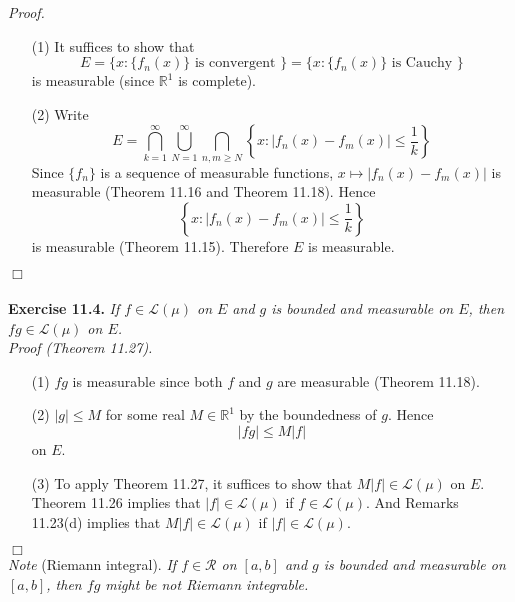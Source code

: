 \documentclass{article}
\begin{document}
\emph{Proof.}
\begin{enumerate}
\item[(1)]
  It suffices to show that
  \[
    E
    = \{ x : \{ f_n(x) \} \text{ is convergent } \}
    = \{ x : \{ f_n(x) \} \text{ is Cauchy } \}
  \]
  is measurable (since $\mathbb{R}^1$ is complete).

\item[(2)]
  Write
  \[
    E
    =
    \bigcap_{k=1}^{\infty}
    \bigcup_{N=1}^{\infty}
    \bigcap_{n,m \geq N} \left\{ x : |f_n(x)-f_m(x)| \leq \frac{1}{k} \right\}
  \]
  Since $\{f_n\}$ is a sequence of measurable functions,
  $x \mapsto |f_n(x)-f_m(x)|$ is measurable
  (Theorem 11.16 and Theorem 11.18).
  Hence
  \[
    \left\{ x : |f_n(x)-f_m(x)| \leq \frac{1}{k} \right\}
  \]
  is measurable (Theorem 11.15).
  Therefore $E$ is measurable.
\end{enumerate}
$\Box$ \\\\






\textbf{Exercise 11.4.}
\emph{If $f \in \mathscr{L}(\mu)$ on $E$ and $g$ is bounded and measurable on $E$,
then $fg \in \mathscr{L}(\mu)$ on $E$.} \\

\emph{Proof (Theorem 11.27).}
\begin{enumerate}
\item[(1)]
  $fg$ is measurable since both $f$ and $g$ are measurable (Theorem 11.18).

\item[(2)]
  $|g| \leq M$ for some real $M \in \mathbb{R}^1$ by the boundedness of $g$.
  Hence
  \[
    |fg| \leq M|f|
  \]
  on $E$.

\item[(3)]
  To apply Theorem 11.27, it suffices to show that
  $M|f| \in \mathscr{L}(\mu)$ on $E$.
  Theorem 11.26 implies that $|f| \in \mathscr{L}(\mu)$ if $f \in \mathscr{L}(\mu)$.
  And Remarks 11.23(d) implies that $M|f| \in \mathscr{L}(\mu)$ if $|f| \in \mathscr{L}(\mu)$.
\end{enumerate}
$\Box$ \\

\emph{Note} (Riemann integral).
  \emph{If $f \in \mathscr{R}$ on $[a,b]$ and $g$ is bounded and measurable on $[a,b]$,
  then $fg$ might be not Riemann integrable.} \\\\
\end{document}
